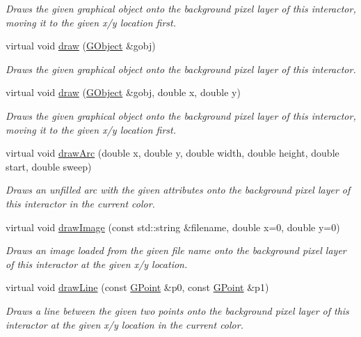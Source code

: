 \begin{DoxyCompactItemize}
\begin{DoxyCompactList}\small\item\em Draws the given graphical object onto the background pixel layer of this interactor, moving it to the given x/y location first. \end{DoxyCompactList}\item 
virtual void \mbox{\hyperlink{classGDrawingSurface_a022a8d51c7fabcd79a0c809233e93453}{draw}} (\mbox{\hyperlink{classGObject}{G\+Object}} \&gobj)
\begin{DoxyCompactList}\small\item\em Draws the given graphical object onto the background pixel layer of this interactor. \end{DoxyCompactList}\item 
virtual void \mbox{\hyperlink{classGDrawingSurface_a8af8762bd6720e0a1d2a84b190e3dc96}{draw}} (\mbox{\hyperlink{classGObject}{G\+Object}} \&gobj, double x, double y)
\begin{DoxyCompactList}\small\item\em Draws the given graphical object onto the background pixel layer of this interactor, moving it to the given x/y location first. \end{DoxyCompactList}\item 
virtual void \mbox{\hyperlink{classGDrawingSurface_a38b6fae1045191c57092b49905068144}{draw\+Arc}} (double x, double y, double width, double height, double start, double sweep)
\begin{DoxyCompactList}\small\item\em Draws an unfilled arc with the given attributes onto the background pixel layer of this interactor in the current color. \end{DoxyCompactList}\item 
virtual void \mbox{\hyperlink{classGDrawingSurface_abdd4cb1f2c64adc5d03522a1ee30febf}{draw\+Image}} (const std\+::string \&filename, double x=0, double y=0)
\begin{DoxyCompactList}\small\item\em Draws an image loaded from the given file name onto the background pixel layer of this interactor at the given x/y location. \end{DoxyCompactList}\item 
virtual void \mbox{\hyperlink{classGDrawingSurface_ae6a24b6b9a6e795d3165c1c750d5bdf1}{draw\+Line}} (const \mbox{\hyperlink{structGPoint}{G\+Point}} \&p0, const \mbox{\hyperlink{structGPoint}{G\+Point}} \&p1)
\begin{DoxyCompactList}\small\item\em Draws a line between the given two points onto the background pixel layer of this interactor at the given x/y location in the current color. \end{DoxyCompactList}\item 

\end{DoxyCompactItemize}
